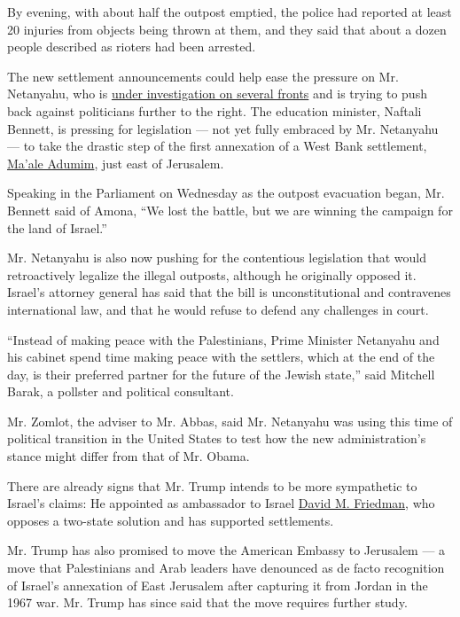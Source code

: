 By evening, with about half the outpost emptied, the police had reported
at least 20 injuries from objects being thrown at them, and they said
that about a dozen people described as rioters had been arrested.

The new settlement announcements could help ease the pressure on Mr.
Netanyahu, who is
\href{https://www.nytimes3xbfgragh.onion/2017/01/03/world/middleeast/israel-netanyahu-graft-investigation.html}{under
investigation on several fronts} and is trying to push back against
politicians further to the right. The education minister, Naftali
Bennett, is pressing for legislation --- not yet fully embraced by Mr.
Netanyahu --- to take the drastic step of the first annexation of a West
Bank settlement,
\href{https://www.nytimes3xbfgragh.onion/2017/01/30/world/middleeast/the-sleepy-israeli-settlement-thats-fast-becoming-a-flash-point.html}{Ma'ale
Adumim}, just east of Jerusalem.

Speaking in the Parliament on Wednesday as the outpost evacuation began,
Mr. Bennett said of Amona, ``We lost the battle, but we are winning the
campaign for the land of Israel.''

Mr. Netanyahu is also now pushing for the contentious legislation that
would retroactively legalize the illegal outposts, although he
originally opposed it. Israel's attorney general has said that the bill
is unconstitutional and contravenes international law, and that he would
refuse to defend any challenges in court.

``Instead of making peace with the Palestinians, Prime Minister
Netanyahu and his cabinet spend time making peace with the settlers,
which at the end of the day, is their preferred partner for the future
of the Jewish state,'' said Mitchell Barak, a pollster and political
consultant.

Mr. Zomlot, the adviser to Mr. Abbas, said Mr. Netanyahu was using this
time of political transition in the United States to test how the new
administration's stance might differ from that of Mr. Obama.

There are already signs that Mr. Trump intends to be more sympathetic to
Israel's claims: He appointed as ambassador to Israel
\href{https://www.nytimes3xbfgragh.onion/2016/12/16/world/middleeast/david-friedman-us-ambassador-israel.html}{David
M. Friedman}, who opposes a two-state solution and has supported
settlements.

Mr. Trump has also promised to move the American Embassy to Jerusalem
--- a move that Palestinians and Arab leaders have denounced as de facto
recognition of Israel's annexation of East Jerusalem after capturing it
from Jordan in the 1967 war. Mr. Trump has since said that the move
requires further study.

